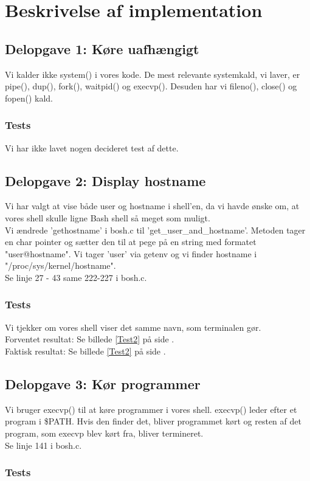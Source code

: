 \section{Beskrivelse af implementation}
\subsection{Delopgave 1: Køre uafhængigt}
\label{D1}
Vi kalder ikke system() i vores kode. De mest relevante systemkald, vi laver, er pipe(), dup(), fork(), waitpid() og execvp(). Desuden har vi fileno(), close() og fopen() kald.
\subsubsection{Tests}
Vi har ikke lavet nogen decideret test af dette.

\subsection{Delopgave 2: Display hostname}
\label{D2}
Vi har valgt at vise både user og hostname i shell'en, da vi havde ønske om, at vores shell skulle ligne Bash shell så meget som muligt.
\\Vi ændrede 'gethostname' i bosh.c til 'get\_user\_and\_hostname'. Metoden tager en char pointer og sætter den til at pege på en string med formatet "user@hostname". Vi tager 'user' via getenv og vi finder hostname i "/proc/sys/kernel/hostname".
\\Se linje 27 - 43 same 222-227 i bosh.c.
\subsubsection{Tests}
Vi tjekker om vores shell viser det samme navn, som terminalen gør.
\\Forventet resultat: Se billede \ref{Test2} på side \pageref{Test2}.
\\Faktisk resultat: Se billede \ref{Test2} på side \pageref{Test2}.

\subsection{Delopgave 3: Kør programmer}
\label{D3}
Vi bruger execvp() til at køre programmer i vores shell. execvp() leder efter et program i \$PATH. Hvis den finder det, bliver programmet kørt og resten af det program, som execvp blev kørt fra, bliver termineret. 
\\Se linje 141 i bosh.c.
\subsubsection{Tests}
